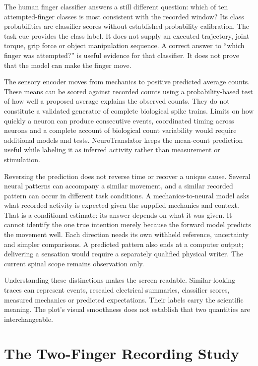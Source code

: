 The human finger classifier answers a still different question: which of ten attempted-finger classes is most consistent with the recorded window? Its class probabilities are classifier scores without established probability calibration. The task cue provides the class label. It does not supply an executed trajectory, joint torque, grip force or object manipulation sequence. A correct answer to ``which finger was attempted?'' is useful evidence for that classifier. It does not prove that the model can make the finger move.\cite{human_fingers2023}

The sensory encoder moves from mechanics to positive predicted average counts. These means can be scored against recorded counts using a probability-based test of how well a proposed average explains the observed counts. They do not constitute a validated generator of complete biological spike trains. Limits on how quickly a neuron can produce consecutive events, coordinated timing across neurons and a complete account of biological count variability would require additional models and tests. NeuroTranslator keeps the mean-count prediction useful while labeling it as inferred activity rather than measurement or stimulation.

Reversing the prediction does not reverse time or recover a unique cause. Several
neural patterns can accompany a similar movement, and a similar recorded pattern
can occur in different task conditions. A mechanics-to-neural model asks what
recorded activity is expected given the supplied mechanics and context. That is
a conditional estimate: its answer depends on what it was given. It cannot
identify the one true intention merely because the forward model predicts the
movement well. Each direction needs its own withheld reference, uncertainty
and simpler comparisons. A predicted pattern also ends at a computer output;
delivering a sensation would require a separately qualified physical writer.
The current spinal scope remains observation only.

Understanding these distinctions makes the screen readable. Similar-looking traces can represent events, rescaled electrical summaries, classifier scores, measured mechanics or predicted expectations. Their labels carry the scientific meaning. The plot's visual smoothness does not establish that two quantities are interchangeable.

\section{The Two-Finger Recording Study}

